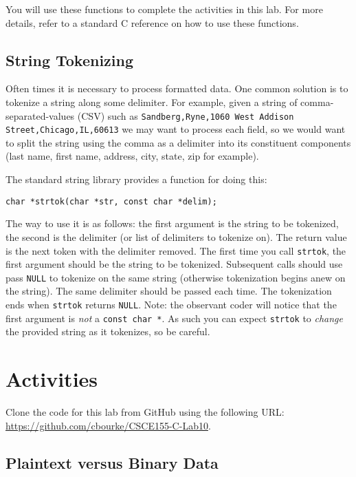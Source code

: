 \documentclass[12pt]{scrartcl}
\begin{document}
You will use these functions to complete the activities in this lab.  For 
more details, refer to a standard C reference on how to use these functions.

\subsection*{String Tokenizing}

Often times it is necessary to process formatted data.  One common 
solution is to tokenize a string along some delimiter.  For example, 
given a string of comma-separated-values (CSV) such as 
\texttt{Sandberg,Ryne,1060 West Addison Street,Chicago,IL,60613}
we may want to process each field, so we would want to split the string using 
the comma as a delimiter into its constituent components (last name, first name, 
address, city, state, zip for example).

The standard string library provides a function for doing this: 

\texttt{char *strtok(char *str, const char *delim);}

The way to use it is as follows: the first argument is the string to be tokenized, 
the second is the delimiter (or list of delimiters to tokenize on).  The return 
value is the next token with the delimiter removed.  The first time you call 
\texttt{strtok}, the first argument should be the string to be tokenized.  
Subsequent calls should use pass \texttt{NULL} to tokenize on the same 
string (otherwise tokenization begins anew on the string).  The same delimiter 
should be passed each time.  The tokenization ends when \texttt{strtok} 
returns \texttt{NULL}.  Note: the observant coder will notice that the first 
argument is \emph{not} a \texttt{const char *}.  As such you can expect 
\texttt{strtok} to \emph{change} the provided string as it tokenizes, so 
be careful.

\section{Activities}

Clone the code for this lab from GitHub using the following URL: 
\url{https://github.com/cbourke/CSCE155-C-Lab10}.

\subsection{Plaintext versus Binary Data}
\end{document}
